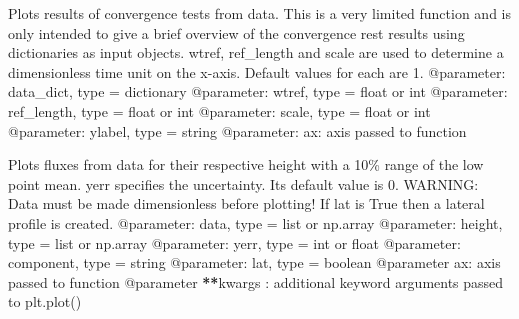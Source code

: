 \documentclass[letterpaper,10pt,english]{sphinxmanual}
\begin{document}

\begin{fulllineitems}
\label{\detokenize{index:windtunnel.plot_convergence_test}}
Plots results of convergence tests  from data. This is a very limited 
function and is only intended to give a brief overview of the convergence
rest results using dictionaries as input objects. wtref, ref\_length and 
scale are used to determine a dimensionless time unit on the x-axis. 
Default values for each are 1.
@parameter: data\_dict, type = dictionary
@parameter: wtref, type = float or int
@parameter: ref\_length, type = float or int
@parameter: scale, type = float or int
@parameter: ylabel, type = string
@parameter: ax: axis passed to function

\end{fulllineitems}


\begin{fulllineitems}
\label{\detokenize{index:windtunnel.plot_fluxes}}
Plots fluxes from data for their respective height with a 10\% range of
the low point mean. yerr specifies the uncertainty. Its default value is 0.
WARNING: Data must be made dimensionless before plotting! If lat is True 
then a lateral profile is created.
@parameter: data, type = list or np.array
@parameter: height, type = list or np.array
@parameter: yerr, type = int or float
@parameter: component, type = string
@parameter: lat, type = boolean
@parameter ax: axis passed to function
@parameter {\color{red}\bfseries{}**}kwargs : additional keyword arguments passed to plt.plot()

\end{fulllineitems}

\end{document}
